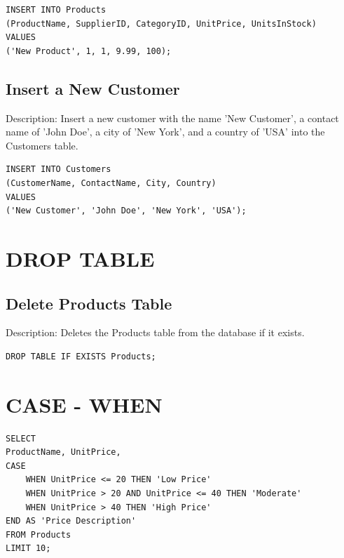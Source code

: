 \documentclass[10pt]{article}
\begin{document}
\begin{verbatim}
INSERT INTO Products 
(ProductName, SupplierID, CategoryID, UnitPrice, UnitsInStock)
VALUES 
('New Product', 1, 1, 9.99, 100);
\end{verbatim}


\subsection{Insert a New Customer}

Description: Insert a new customer with the name 'New Customer',
a contact name of 'John Doe', a city of 'New York', and a 
country of 'USA' into the Customers table.

\begin{verbatim}
INSERT INTO Customers
(CustomerName, ContactName, City, Country)
VALUES
('New Customer', 'John Doe', 'New York', 'USA');
\end{verbatim}


\section{DROP TABLE}

\subsection{Delete Products Table}

Description: Deletes the Products table from the database if it exists.

\begin{verbatim}
DROP TABLE IF EXISTS Products;
\end{verbatim}




\section{CASE - WHEN}

\begin{verbatim}
SELECT 
ProductName, UnitPrice, 
CASE 
    WHEN UnitPrice <= 20 THEN 'Low Price'
    WHEN UnitPrice > 20 AND UnitPrice <= 40 THEN 'Moderate'
    WHEN UnitPrice > 40 THEN 'High Price'
END AS 'Price Description'
FROM Products 
LIMIT 10;
\end{verbatim}
\end{document}
